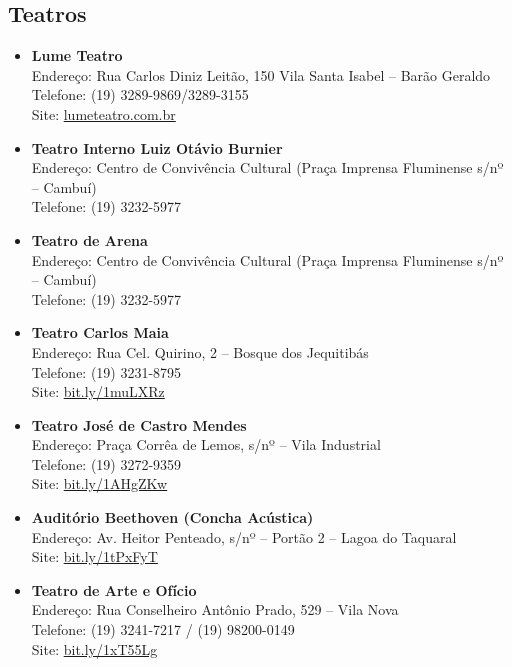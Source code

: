 \subsection{Teatros}

\begin{itemize}
\item \textbf{Lume Teatro}
  \\Endereço:  Rua Carlos Diniz Leitão, 150 Vila Santa Isabel -- Barão Geraldo
  \\Telefone: (19) 3289-9869/3289-3155
  \\Site: \url{lumeteatro.com.br}

\item \textbf{Teatro Interno Luiz Otávio Burnier}
  \\Endereço: Centro de Convivência Cultural (Praça Imprensa Fluminense s/nº --
  Cambuí)
  \\Telefone: (19) 3232-5977

\item \textbf{Teatro de Arena}
  \\Endereço: Centro de Convivência Cultural (Praça Imprensa Fluminense s/nº --
  Cambuí)
  \\Telefone: (19) 3232-5977

\item \textbf{Teatro Carlos Maia}
  \\Endereço: Rua Cel. Quirino, 2 -- Bosque dos Jequitibás
  \\Telefone: (19) 3231-8795
  \\Site: \url{bit.ly/1muLXRz}

\item \textbf{Teatro José de Castro Mendes}
  \\Endereço: Praça Corrêa de Lemos, s/nº -- Vila Industrial
  \\Telefone: (19) 3272-9359
  \\Site: \url{bit.ly/1AHgZKw}

\item \textbf{Auditório Beethoven (Concha Acústica)}
  \\Endereço: Av. Heitor Penteado, s/nº -- Portão 2 -- Lagoa do Taquaral
  \\Site: \url{bit.ly/1tPxFyT}

\item \textbf{Teatro de Arte e Ofício}
  \\Endereço: Rua Conselheiro Antônio Prado, 529 -- Vila Nova
  \\Telefone: (19) 3241-7217 / (19) 98200-0149
  \\Site: \url{bit.ly/1xT55Lg}


\end{itemize}
